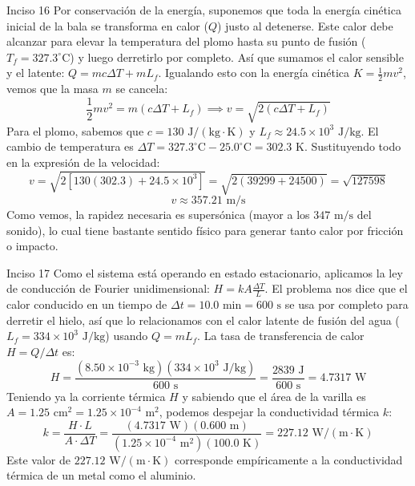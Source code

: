 \documentclass[11pt,letterpaper]{article}
\begin{document}
\begin{inciso}{Inciso 16}
Por conservación de la energía, suponemos que toda la energía cinética inicial de la bala se transforma en calor ($Q$) justo al detenerse. Este calor debe alcanzar para elevar la temperatura del plomo hasta su punto de fusión ($T_{f} = 327.3^{\circ}\text{C}$) y luego derretirlo por completo. Así que sumamos el calor sensible y el latente: $Q = mc\Delta T + mL_{f}$. Igualando esto con la energía cinética $K = \frac{1}{2}mv^{2}$, vemos que la masa $m$ se cancela:
$$ \frac{1}{2}mv^{2} = m(c\Delta T + L_{f}) \implies v = \sqrt{2(c\Delta T + L_{f})} $$
Para el plomo, sabemos que $c = 130\text{ J}/(\text{kg}\cdot\text{K})$ y $L_{f} \approx 24.5 \times 10^{3}\text{ J/kg}$. El cambio de temperatura es $\Delta T = 327.3^{\circ}\text{C} - 25.0^{\circ}\text{C} = 302.3\text{ K}$. Sustituyendo todo en la expresión de la velocidad:
$$ v = \sqrt{2 \left[ 130 (302.3) + 24.5 \times 10^{3} \right]} = \sqrt{2 (39299 + 24500)} = \sqrt{127598} $$
$$ v \approx 357.21\text{ m/s} $$
Como vemos, la rapidez necesaria es supersónica (mayor a los $347\text{ m/s}$ del sonido), lo cual tiene bastante sentido físico para generar tanto calor por fricción o impacto.
\end{inciso}
\begin{inciso}{Inciso 17}
Como el sistema está operando en estado estacionario, aplicamos la ley de conducción de Fourier unidimensional: $H = kA \frac{\Delta T}{L}$. El problema nos dice que el calor conducido en un tiempo de $\Delta t = 10.0\text{ min} = 600\text{ s}$ se usa por completo para derretir el hielo, así que lo relacionamos con el calor latente de fusión del agua ($L_{f} = 334 \times 10^{3}\text{ J/kg}$) usando $Q = mL_{f}$. La tasa de transferencia de calor $H = Q/\Delta t$ es:
$$ H = \frac{(8.50 \times 10^{-3}\text{ kg})(334 \times 10^{3}\text{ J/kg})}{600\text{ s}} = \frac{2839\text{ J}}{600\text{ s}} = 4.7317\text{ W} $$
Teniendo ya la corriente térmica $H$ y sabiendo que el área de la varilla es $A = 1.25\text{ cm}^{2} = 1.25 \times 10^{-4}\text{ m}^{2}$, podemos despejar la conductividad térmica $k$:
$$ k = \frac{H \cdot L}{A \cdot \Delta T} = \frac{(4.7317\text{ W})(0.600\text{ m})}{(1.25 \times 10^{-4}\text{ m}^{2})(100.0\text{ K})} = 227.12\text{ W}/(\text{m}\cdot\text{K}) $$
Este valor de $227.12\text{ W}/(\text{m}\cdot\text{K})$ corresponde empíricamente a la conductividad térmica de un metal como el aluminio.
\end{inciso}
\end{document}
